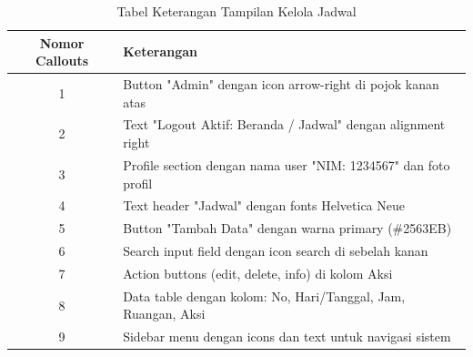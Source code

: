 \begin{enumerate}
	      \begin{table}[H]
		      \centering
		      \caption{Tabel Keterangan Tampilan Kelola Jadwal}
		      \begin{tabular}{|c|p{}|}
			      \hline
			      \textbf{Nomor Callouts} & \textbf{Keterangan}                                             \\
			      \hline
			      1                       & Button "Admin" dengan icon arrow-right di pojok kanan atas      \\
			      2                       & Text "Logout Aktif: Beranda / Jadwal" dengan alignment right    \\
			      3                       & Profile section dengan nama user "NIM: 1234567" dan foto profil \\
			      4                       & Text header "Jadwal" dengan fonts Helvetica Neue                \\
			      5                       & Button "Tambah Data" dengan warna primary (\#2563EB)            \\
			      6                       & Search input field dengan icon search di sebelah kanan          \\
			      7                       & Action buttons (edit, delete, info) di kolom Aksi               \\
			      8                       & Data table dengan kolom: No, Hari/Tanggal, Jam, Ruangan, Aksi   \\
			      9                       & Sidebar menu dengan icons dan text untuk navigasi sistem        \\
			      \hline
		      \end{tabular}
	      \end{table}


\end{enumerate}
